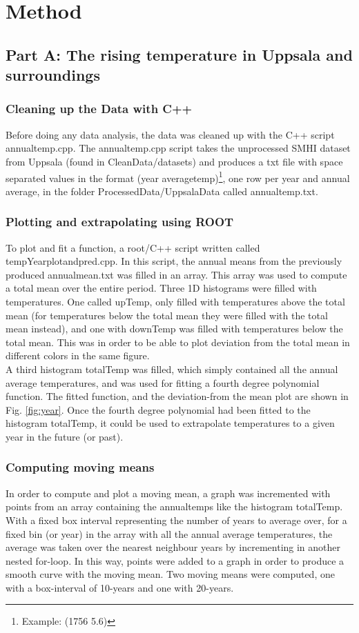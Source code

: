 \documentclass[a4paper]{article}
\begin{document}
\section{Method}\label{sec:method}

\subsection{Part A: The rising temperature in Uppsala and surroundings}
\subsubsection{Cleaning up the Data with C++}
Before doing any data analysis, the data was cleaned up with the C++ script annualtemp.cpp. The annualtemp.cpp script takes the unprocessed SMHI dataset from Uppsala (found in CleanData/datasets) and produces a txt file with space separated values in the format (year averagetemp)\footnote{Example: (1756 5.6)}, one row per year and annual average, in the folder ProcessedData/UppsalaData called annualtemp.txt. 

\subsubsection{Plotting and extrapolating using ROOT}
To plot and fit a function, a root/C++ script written called tempYearplotandpred.cpp. In this script, the annual means from the previously produced annualmean.txt was filled in an array. This array was used to compute a total mean over the entire period. Three 1D histograms were filled with
temperatures. One called upTemp, only filled with temperatures above the total mean (for temperatures below the total mean they were filled with the total mean instead), and one with downTemp was filled with temperatures below the total mean. This was in order to be able to plot deviation from the total mean in different colors in the same figure.\\

A third histogram totalTemp was filled, which simply contained all the annual average temperatures, and was used for fitting a fourth degree polynomial function. The fitted function, and the deviation-from the mean plot are shown in Fig. \ref{fig:year}. Once the fourth degree polynomial had been fitted to the histogram totalTemp, it could be used to extrapolate temperatures to a given year in the future (or past).

\subsubsection{Computing moving means}
In order to compute and plot a moving mean, a graph was incremented with points from an array containing the annualtemps like the histogram totalTemp. With a fixed box interval representing the number of years to average over, for a fixed bin (or year) in the array with all the annual average temperatures, the average was taken over the nearest neighbour years by incrementing in another nested for-loop. In this way, points were added to a graph in order to produce a smooth curve with the moving mean. Two moving means were computed, one with a box-interval of 10-years and one with 20-years.
\end{document}
